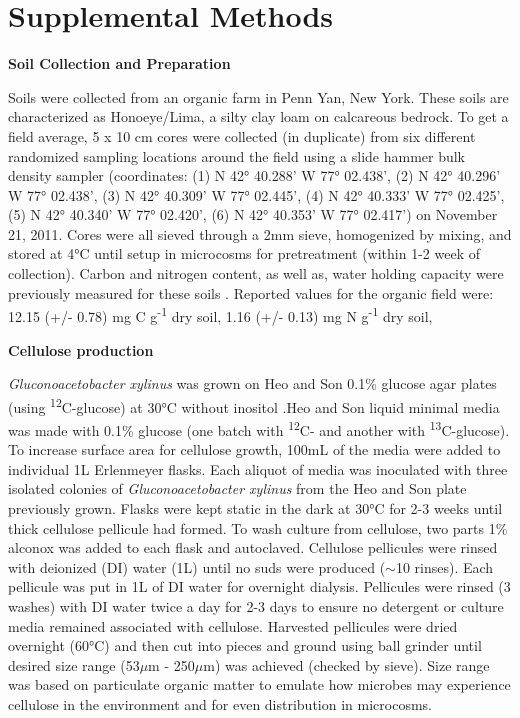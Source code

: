 \section{Supplemental Methods}


\textbf{Soil Collection and Preparation}



Soils were collected from an organic farm in Penn Yan, New York.  These soils are characterized as Honoeye/Lima, a silty clay loam on calcareous bedrock. To get a field average, 5 x 10 cm cores were collected (in duplicate) from six different randomized sampling locations around the field using a slide hammer bulk density sampler (coordinates: (1) N 42° 40.288’ W 77° 02.438’, (2) N 42° 40.296’ W 77° 02.438’, (3) N 42° 40.309’ W 77° 02.445’, (4) N 42° 40.333’ W 77° 02.425’, (5) N 42° 40.340’ W 77° 02.420’, (6) N 42° 40.353’ W 77° 02.417’) on November 21, 2011. Cores were all sieved through a 2mm sieve, homogenized by mixing, and stored at 4°C until setup in microcosms for pretreatment (within 1-2 week of collection). Carbon and nitrogen content, as well as, water holding capacity were previously measured for these soils \cite{Berthrong_2013}. Reported values for the organic field were: 12.15 (+/- 0.78) mg C g\textsuperscript{-1} dry soil, 1.16 (+/- 0.13) mg N g\textsuperscript{-1} dry soil,  



\textbf{Cellulose production}



\textit{Gluconoacetobacter xylinus} was grown on Heo and Son 0.1\% glucose agar plates (using \textsuperscript{12}C-glucose) at 30°C without inositol \cite{Heo_2002}.Heo and Son liquid minimal media was made with 0.1\% glucose (one batch with \textsuperscript{12}C- and another with \textsuperscript{13}C-glucose). To increase surface area for cellulose growth, 100mL of the media were added to individual 1L Erlenmeyer flasks. Each aliquot of media was inoculated with three isolated colonies of \textit{Gluconoacetobacter xylinus} from the Heo and Son plate previously grown.  Flasks were kept static in the dark at 30°C for 2-3 weeks until thick cellulose pellicule had formed.  To wash culture from cellulose, two parts 1\% alconox was added to each flask and autoclaved. Cellulose pellicules were rinsed with deionized (DI) water (1L) until no suds were produced ($\sim$10 rinses). Each pellicule was put in 1L of DI water for overnight dialysis.  Pellicules were rinsed (3 washes) with DI water twice a day for 2-3 days to ensure no detergent or culture media remained associated with cellulose. Harvested pellicules were dried overnight (60°C) and then cut into pieces and ground using ball grinder until desired size range (53$\mu$m - 250$\mu$m) was achieved (checked by sieve). Size range was based on particulate organic matter to emulate how microbes may experience cellulose in the environment \cite{Cambardella_1992} and for even distribution in microcosms. 


